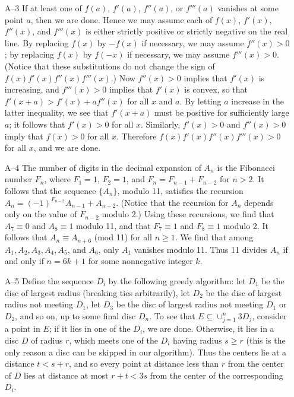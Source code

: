 \documentclass[amssymb,twocolumn,pra,10pt,aps]{revtex4-1}
\begin{document}
\begin{itemize}
\item[A--3]
If at least one of $f(a)$, $f'(a)$, $f''(a)$, or $f'''(a)$ vanishes
at some point $a$, then we are done.  Hence we may assume each of
$f(x)$, $f'(x)$, $f''(x)$, and $f'''(x)$ is either strictly positive
or strictly negative on the real line.  By replacing $f(x)$ by $-f(x)$
if necessary, we may assume $f''(x)>0$; by replacing $f(x)$
by $f(-x)$ if necessary, we may assume $f'''(x)>0$.  (Notice that these
substitutions do not change the sign of $f(x) f'(x) f''(x) f'''(x)$.)
Now $f''(x)>0$ implies that $f'(x)$ is increasing, and $f'''(x)>0$
implies that $f'(x)$ is convex, so that $f'(x+a)>f'(x)+a f''(x)$
for all $x$ and $a$.  By
letting $a$ increase in the latter inequality, we see that $f'(x+a)$
must be positive for sufficiently large $a$; it follows that
$f'(x)>0$
for all $x$.  Similarly, $f'(x)>0$ and $f''(x)>0$ imply
that $f(x)>0$ for all $x$.  Therefore $f(x) f'(x) f''(x) f'''(x)>0$ for
all $x$, and we are done.

\item[A--4]
The number of digits in the decimal expansion of $A_n$ is the
Fibonacci number $F_n$, where $F_1=1$, $F_2=1$, and $F_n=F_{n-1}
+F_{n-2}$ for $n>2$.  It follows that the sequence $\{A_n\}$, modulo 11,
satisfies the recursion $A_n=(-1)^{F_{n-2}}A_{n-1} + A_{n-2}$.
(Notice that the recursion for $A_n$ depends only on the value of
$F_{n-2}$ modulo 2.)  Using these recursions, we find that
$A_7 \equiv 0$ and $A_8 \equiv 1$ modulo 11, and that
$F_7 \equiv 1$ and $F_8 \equiv 1$ modulo 2.
It follows that $A_n \equiv A_{n+6}$ (mod 11) for all $n\geq 1$.
We find that among
$A_1,A_2,A_3,A_4,A_5$, and $A_6$, only $A_1$ vanishes modulo 11.
Thus 11 divides $A_n$ if and only if $n=6k+1$ for some
nonnegative integer $k$.

\item[A--5]
Define the sequence $D_i$ by the following greedy algorithm:
let $D_1$ be the disc of largest radius (breaking ties arbitrarily),
let $D_2$ be the disc of largest radius not meeting $D_1$, let
$D_3$ be the disc of largest radius not meeting $D_1$ or $D_2$,
and so on, up to some final disc $D_n$.
To see that $E \subseteq \cup_{j=1}^n 3D_j$, consider
a point in $E$; if it lies in one of the $D_i$, we are done. Otherwise,
it lies in a disc $D$ of radius $r$, which meets one of the $D_i$ having
radius $s \geq r$ (this is the only reason a disc can be skipped in
our algorithm). Thus
the centers lie at a distance $t < s+r$, and so every point at distance
less than $r$ from the center of $D$ lies at distance at most
$r + t < 3s$ from the center of the corresponding $D_i$.


\end{itemize}
\end{document}
